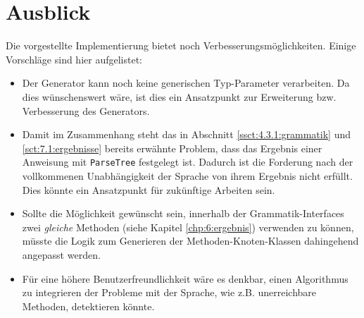 \section{Ausblick}\label{sct:7.2:ausblick}
Die vorgestellte Implementierung bietet noch Verbesserungsmöglichkeiten. Einige Vorschläge sind hier aufgelistet:

\begin{itemize}
	\item Der Generator kann noch keine generischen Typ-Parameter verarbeiten. Da dies wünschenswert wäre, ist dies ein Ansatzpunkt zur Erweiterung bzw. Verbesserung des Generators.
	\item Damit im Zusammenhang steht das in Abschnitt \ref{ssct:4.3.1:grammatik} und \ref{sct:7.1:ergebnisse} bereits erwähnte Problem, dass das Ergebnis einer Anweisung mit \texttt{ParseTree} festgelegt ist. Dadurch ist die Forderung nach der vollkommenen Unabhängigkeit der Sprache von ihrem Ergebnis nicht erfüllt. Dies könnte ein Ansatzpunkt für zukünftige Arbeiten sein.
	\item Sollte die Möglichkeit gewünscht sein, innerhalb der Grammatik-Interfaces zwei \emph{gleiche} Methoden (siehe Kapitel \ref{chp:6:ergebnis}) verwenden zu können, müsste die Logik zum Generieren der Methoden-Knoten-Klassen dahingehend angepasst werden.
	\item Für eine höhere Benutzerfreundlichkeit wäre es denkbar, einen Algorithmus zu integrieren der Probleme mit der Sprache, wie z.B. unerreichbare Methoden, detektieren könnte.
\end{itemize}